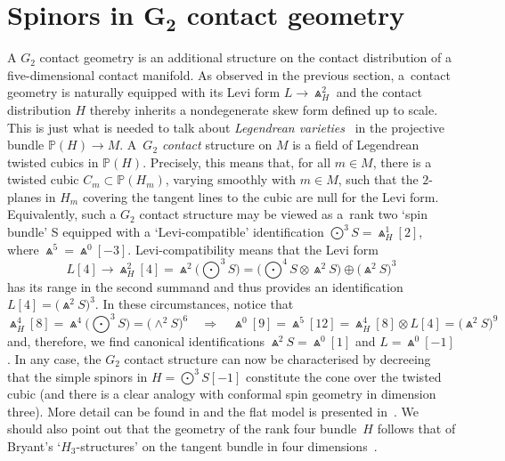 \documentclass[pdftex]{sigma}%
\numberwithin{equation}{section}
\begin{document}
\section[Spinors in G\_2 contact geometry]{Spinors in $\boldsymbol{G_2}$ contact geometry}\label{G2}
A $G_2$ contact geometry is an additional structure on the contact distribution
of a five-dimensional contact manifold. As observed in the previous section, a~contact geometry is naturally equipped with its Levi form $L\to\Wedge_H^2$ and
the contact distribution $H$ thereby inherits a nondegenerate skew form
defined up to scale. This is just what is needed to talk about {\em Legendrean
varieties}~\cite{LM} in the projective bundle ${\mathbb{P}}(H)\to M$. A~{\em $G_2$ contact} structure on $M$ is a field of Legendrean twisted cubics
in ${\mathbb{P}}(H)$. Precisely, this means that, for all $m\in M$, there is a
twisted cubic $C_m\subset{\mathbb{P}}(H_m)$, varying smoothly with $m\in M$,
such that the $2$-planes in $H_m$ covering the tangent lines to the cubic are
null for the Levi form. Equivalently, such a $G_2$ contact structure may be
viewed as a~rank two `spin bundle' S equipped with a `Levi-compatible'
identification $\bigodot^3\!S=\Wedge_H^1[2]$, where $\Wedge^5=\Wedge^0[-3]$.
Levi-compatibility means that the Levi form
\[\textstyle
L[4]\to\Wedge_H^2[4]=\Wedge^2\big({\bigodot}^3\!S\big)
=\big({\bigodot}^4\!S\otimes\Wedge^2S\big)\oplus\big({\Wedge}^2S\big)^3\]
has its range in the second summand and thus provides an identification
$L[4]=\big({\Wedge}^2S\big)^3$. In these circumstances, notice that
\[\textstyle\Wedge_H^4[8]=\Wedge^4\big({\bigodot}^3\!S\big)=\big({\wedge}^2S\big)^6\quad
\Rightarrow\quad
\Wedge^0[9]=\Wedge^5[12]=\Wedge_H^4[8]\otimes L[4]=
\big({\Wedge}^2S\big)^9\]
and, therefore, we find canonical identifications $\Wedge^2S=\Wedge^0[1]$ and
$L=\Wedge^0[-1]$. In any case, the $G_2$ contact structure can now be
characterised by decreeing that the simple spinors in $H=\bigodot^3\!S[-1]$
constitute the cone over the twisted cubic (and there is a clear analogy with
conformal spin geometry in dimension three). More detail can be found in
\cite[Section~5]{EN2} and the flat model is presented in~\cite[Section~4]{EN1}. We should
also point out that the geometry of the rank four bundle~$H$ follows that of
Bryant's `$H_3$-structures' on the tangent bundle in four dimensions~\cite{B}.
\end{document}
